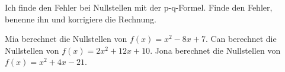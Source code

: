 \begin{aufgabe}{Ich finde den Fehler bei Nullstellen mit der p-q-Formel.}
Finde den Fehler, benenne ihn und korrigiere die Rechnung.
\begin{teile}
\teil Mia berechnet die Nullstellen von $f(x) = x^2 - 8x + 7$.
\teil Can berechnet die Nullstellen von $f(x) = 2x^2 + 12x + 10$.
\teil Jona berechnet die Nullstellen von $f(x) = x^2 + 4x - 21$.
\end{teile}
\end{aufgabe}
